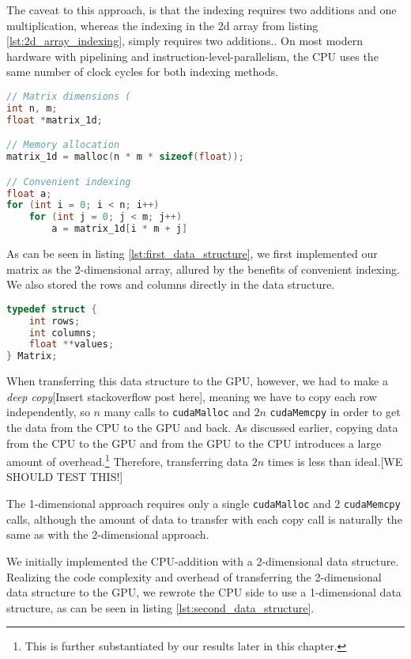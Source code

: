 The caveat to this approach, is that the indexing requires two additions and one multiplication, whereas the indexing in the 2d array from listing \ref{lst:2d_array_indexing}, simply requires two additions.\cite{numericalrecipes}. On most modern hardware with pipelining and instruction-level-parallelism, the CPU uses the same number of clock cycles for both indexing methods.%

\begin{lstlisting}[language=C, caption={Allocation and indexing of a float *}, label={lst:1d_array_indexing}]
// Matrix dimensions (
int n, m;
float *matrix_1d;

// Memory allocation
matrix_1d = malloc(n * m * sizeof(float));

// Convenient indexing
float a;
for (int i = 0; i < n; i++)
    for (int j = 0; j < m; j++)
        a = matrix_1d[i * m + j]
\end{lstlisting}

\noindent As can be seen in listing \ref{lst:first_data_structure}, we first implemented our matrix as the 2-dimensional array, allured by the benefits of convenient indexing. We also stored the rows and columns directly in the data structure.

\begin{lstlisting}[language=C, caption={First implementation of the matrix data structure.}, label={lst:first_data_structure}]
typedef struct {
    int rows;
    int columns;
    float **values;
} Matrix;
\end{lstlisting}

\noindent When transferring this data structure to the GPU, however, we had to make a \textit{deep copy}[Insert stackoverflow post here], meaning we have to copy each row independently, so \(n\) many calls to \texttt{cudaMalloc} and \(2n\) \texttt{cudaMemcpy} in order to get the data from the CPU to the GPU and back. As discussed earlier, copying data from the CPU to the GPU and from the GPU to the CPU introduces a large amount of overhead.\footnote{This is further substantiated by our results later in this chapter.} Therefore, transferring data \(2n\) times is less than ideal.[WE SHOULD TEST THIS!]

The 1-dimensional approach requires only a single \texttt{cudaMalloc} and 2 \texttt{cudaMemcpy} calls, although the amount of data to transfer with each copy call is naturally the same as with the 2-dimensional approach.

We initially implemented the CPU-addition with a 2-dimensional data structure. Realizing the code complexity and overhead of transferring the 2-dimensional data structure to the GPU, we rewrote the CPU side to use a 1-dimensional data structure, as can be seen in listing \ref{lst:second_data_structure}.

